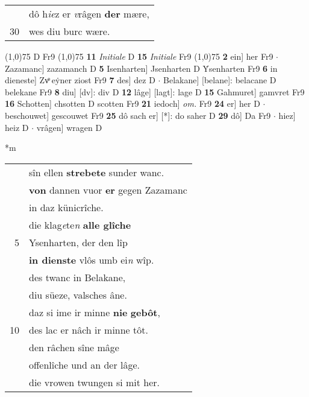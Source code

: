 \documentclass[8pt,a4paper,notitlepage]{article}
\begin{document}
\begin{table}[ht]
\begin{minipage}[t]{0.5\linewidth}
\begin{tabular}{rl}
 & dô h\textit{ie}z er \textit{v}râgen \textbf{der} mære,\\ 
30 & wes diu burc wære.\\ 
\end{tabular}
\scriptsize
\line(1,0){75} \newline
D Fr9 \newline
\line(1,0){75} \newline
\textbf{11} \textit{Initiale} D  \textbf{15} \textit{Initiale} Fr9  \newline
\line(1,0){75} \newline
\textbf{2} ein] her Fr9  $\cdot$ Zazamanc] zazamanch D \textbf{5} Isenharten] Jsenharten D Ẏsenharten Fr9 \textbf{6} in dieneste] Zvͦ eẏner ziost Fr9 \textbf{7} des] dez D  $\cdot$ Belakane] [belane]: belacane D belekane Fr9 \textbf{8} diu] [dv]: div D \textbf{12} lâge] [lagt]: lage D \textbf{15} Gahmuret] gamvret Fr9 \textbf{16} Schotten] chsotten D scotten Fr9 \textbf{21} iedoch] \textit{om.} Fr9 \textbf{24} er] her D  $\cdot$ beschouwet] gescouwet Fr9 \textbf{25} dô sach er] [*]: do saher D \textbf{29} dô] Da Fr9  $\cdot$ hiez] heiz D  $\cdot$ vrâgen] wragen D \newline
\end{minipage}
\hspace{0.5cm}
\begin{minipage}[t]{0.5\linewidth}
\small
\begin{center}*m
\end{center}
\begin{tabular}{rl}
 & sîn ellen \textbf{strebete} sunder wanc.\\ 
 & \textbf{von} dannen vuor \textbf{er} gegen Zazamanc\\ 
 & in daz künicrîche.\\ 
 & die klag\textit{e}te\textit{n} \textbf{alle glîche}\\ 
5 & Ysenharten, der den lîp\\ 
 & \textbf{in dienste} vlôs umb ei\textit{n} wîp.\\ 
 & des twanc in Belakane,\\ 
 & diu süeze, valsches âne.\\ 
 & daz si ime ir minne \textbf{nie} \textbf{gebôt},\\ 
10 & des lac er nâch ir minne tôt.\\ 
 & den râchen sîne mâge\\ 
 & offenlîche und an der lâge.\\ 
 & die vrowen twungen si mit her.\\ 

\end{tabular}
\end{minipage}
\end{table}
\end{document}
